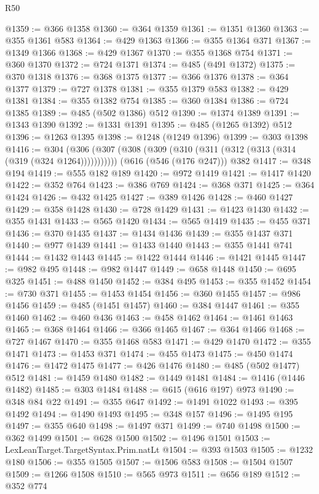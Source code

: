 \begin{lexlean}{R50}
\begin{coremodule}
@1359 := @366 @1358
@1360 := @364 @1359
@1361 := @1351 @1360
@1363 := @355 @1361 @583
@1364 := @429 @1363
@1366 := @355 @1364 @371
@1367 := @1349 @1366
@1368 := @429 @1367
@1370 := @355 @1368 @754
@1371 := @360 @1370
@1372 := @724 @1371
@1374 := @485 (@491 @1372)
@1375 := @370 @1318
@1376 := @368 @1375
@1377 := @366 @1376
@1378 := @364 @1377
@1379 := @727 @1378
@1381 := @355 @1379 @583
@1382 := @429 @1381
@1384 := @355 @1382 @754
@1385 := @360 @1384
@1386 := @724 @1385
@1389 := @485 (@502 @1386) @512
@1390 := @1374 @1389
@1391 := @1343 @1390
@1392 := @1331 @1391
@1395 := @485 (@1265 @1392) @512
@1396 := @1263 @1395
@1398 := @1248 (@1249 @1396)
@1399 := @303 @1398
@1416 := @304
    (@306 (@307 (@308 (@309 (@310 (@311 (@312 (@313 (@314 (@319 (@324 @1264)))))))))))
    (@616 (@546 (@176 @247)))
    @382
@1417 := @348 @194
@1419 := @555 @182 @189
@1420 := @972 @1419
@1421 := @1417 @1420
@1422 := @352 @764
@1423 := @386 @769
@1424 := @368 @371
@1425 := @364 @1424
@1426 := @432 @1425
@1427 := @389 @1426
@1428 := @460 @1427
@1429 := @358 @1428
@1430 := @728 @1429
@1431 := @1423 @1430
@1432 := @355 @1431
@1433 := @565 @1420
@1434 := @565 @1419
@1435 := @455 @371
@1436 := @370 @1435
@1437 := @1434 @1436
@1439 := @355 @1437 @371
@1440 := @977 @1439
@1441 := @1433 @1440
@1443 := @355 @1441 @741
@1444 := @1432 @1443
@1445 := @1422 @1444
@1446 := @1421 @1445
@1447 := @982 @495
@1448 := @982 @1447
@1449 := @658 @1448
@1450 := @695 @325
@1451 := @488 @1450
@1452 := @384 @495
@1453 := @355 @1452
@1454 := @730 @371
@1455 := @1453 @1454
@1456 := @360 @1455
@1457 := @986 @1456
@1459 := @485 (@1451 @1457)
@1460 := @384 @1447
@1461 := @355 @1460
@1462 := @460 @436
@1463 := @458 @1462
@1464 := @1461 @1463
@1465 := @368 @1464
@1466 := @366 @1465
@1467 := @364 @1466
@1468 := @727 @1467
@1470 := @355 @1468 @583
@1471 := @429 @1470
@1472 := @355 @1471
@1473 := @1453 @371
@1474 := @455 @1473
@1475 := @450 @1474
@1476 := @1472 @1475
@1477 := @426 @1476
@1480 := @485 (@502 @1477) @512
@1481 := @1459 @1480
@1482 := @1449 @1481
@1484 := @1416 (@1446 @1482)
@1485 := @303 @1484
@1488 := @615 (@616 @197) @973
@1490 := @348 @84 @22
@1491 := @355 @647
@1492 := @1491 @1022
@1493 := @395 @1492
@1494 := @1490 @1493
@1495 := @348 @157
@1496 := @1495 @195
@1497 := @355 @640
@1498 := @1497 @371
@1499 := @740 @1498
@1500 := @362 @1499
@1501 := @628 @1500
@1502 := @1496 @1501
@1503 := LexLeanTarget.TargetSyntax.Prim.natLt
@1504 := @393 @1503
@1505 := @1232 @180
@1506 := @355 @1505
@1507 := @1506 @583
@1508 := @1504 @1507
@1509 := @1266 @1508
@1510 := @565 @973
@1511 := @656 @189
@1512 := @352 @774

\end{coremodule}
\end{lexlean}
